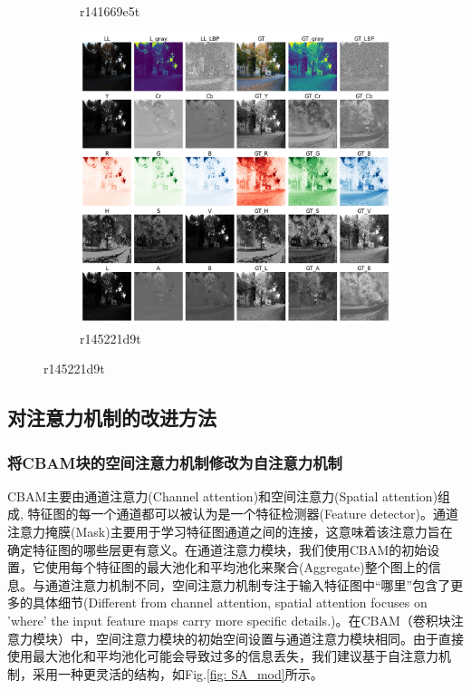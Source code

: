 \documentclass[a4paper]{ctexart}
\begin{document}
\begin{figure}[htbp]
\begin{subfigure}{0.3\textwidth}
				\captionsetup{font=scriptsize}
				\caption{r141669e5t}
				\label{fig: myplot_different_color_channels_r141669e5t}	
			\end{subfigure}
			\begin{subfigure}{0.3\textwidth}
				\includegraphics[width=\linewidth]{picture/LLIE/Experiment/myplot_different_color_channels_r145221d9t}
				\captionsetup{font=scriptsize}
				\caption{r145221d9t}
				\label{fig: myplot_different_color_channels_r145221d9t}	
			\end{subfigure}
		\end{figure}
		
		\FloatBarrier
		
		\subsection*{对注意力机制的改进方法}
		
		\subsubsection*{将CBAM块的空间注意力机制修改为自注意力机制}
		
		CBAM主要由通道注意力(Channel attention)和空间注意力(Spatial attention)组成, 特征图的每一个通道都可以被认为是一个特征检测器(Feature detector)\cite{zeiler2014visualizing}。通道注意力掩膜(Mask)主要用于学习特征图通道之间的连接，这意味着该注意力旨在确定特征图的哪些层更有意义。在通道注意力模块，我们使用CBAM的初始设置，它使用每个特征图的最大池化和平均池化来聚合(Aggregate)整个图上的信息。与通道注意力机制不同，空间注意力机制专注于输入特征图中“哪里”包含了更多的具体细节(Different from channel attention, spatial attention focuses on 'where' the input feature maps carry more specific details.)。在CBAM（卷积块注意力模块）中，空间注意力模块的初始空间设置与通道注意力模块相同。由于直接使用最大池化和平均池化可能会导致过多的信息丢失，我们建议基于自注意力机制，采用一种更灵活的结构，如Fig.\ref{fig: SA_mod}所示。
		
\end{document}
